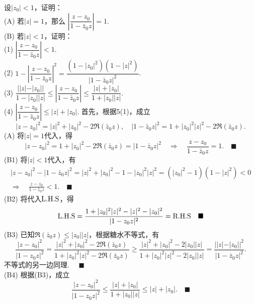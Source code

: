 \vspace{1cm}
\par{} 设$|z_0|<1$，证明：\\
(A) 若$|z|=1$，那么 $\left|\dfrac{z-z_0}{1-\bar{z}_0z}\right|=1$.\\
(B) 若$|z|<1$，证明：\\
(1) $\left|\dfrac{z-z_0}{1-\bar{z}_0z}\right|<1$.\\
(2) $1-\left|\dfrac{z-z_0}{1-\bar{z}_0z}\right|^2 =
     \dfrac{(1-|z_0|^2)(1-|z|^2)}{|1-\bar{z}_0z|^2}$.\\
(3) $\dfrac{||z|-|z_0||}{1-|z_0||z|} \le
     \left|\dfrac{z-z_0}{1-\bar{z}_0z}\right| \le
      \dfrac{|z|+|z_0|}{1+|z_0||z|}$.\\
(4) $\left|\dfrac{z-z_0}{1-\bar{z}_0z}\right| \le |z|+|z_0|$.
\proof
  首先，根据5(1)，成立
  \begin{equation}
    \label{eq1}
    |z-z_0|^2 = |z|^2 + |z_0|^2 - 2\Re(\bar{z}_0z)
    ,\quad
    |1-\bar{z}_0z|^2 = 1 + |z_0|^2|z|^2 - 2\Re(\bar{z}_0z).
  \end{equation}
(A) 将$|z|=1$代入，得
  \[
    |z-z_0|^2 = 1 + |z_0|^2 - 2\Re(\bar{z}_0z) = |1-\bar{z}_0z|^2
    \quad\Rightarrow\quad \frac{z-z_0}{1-\bar{z}_0z} = 1. \quad\blacksquare
  \]
(B1) 将$|z|<1$代入，有
  \begin{gather*}
    |z-z_0|^2 - |1-\bar{z}_0z|^2 = |z|^2 + |z_0|^2 - 1 - |z_0|^2|z|^2
     = (|z_0|^2-1)(1-|z|^2) < 0 \\
    \Rightarrow\quad
    \frac{z-z_0}{1-\bar{z}_0z} < 1.\quad\blacksquare
  \end{gather*}
(B2) 将代入$\text{L.H.S}$，得
  \[
    \text{L.H.S} = \frac{1+|z_0|^2|z|^2 - |z|^2 - |z_0|^2}{|1-z_0z|^2} = \text{R.H.S}
    \quad\blacksquare
  \]
(B3) 已知$\Re(\bar{z}_0z) \le |z_0||z|$，根据糖水不等式，有
  \[
    \frac{|z-z_0|^2}{|1-z_0z|^2} =
    \frac{|z|^2+|z_0|^2-2\Re(\bar{z}_0z)}{1+|z_0|^2|z|^2-2\Re(\bar{z}_0z)}
    \ge \frac{|z|^2+|z_0|^2 - 2|z_0||z|}{1+|z_0|^2|z|^2-2|z_0||z|} =
    \frac{||z|-|z_0||^2}{|1-\bar{z}_0z|^2}.
  \]
  不等式的另一边同理. $\quad\blacksquare$\\
(B4) 根据(B3)，成立
  \[
    \frac{|z-z_0|^2}{|1-z_0z|^2} \le \frac{|z|+|z_0|}{1+|z_0||z|} \le |z|+|z_0|.
    \quad\blacksquare
  \]

